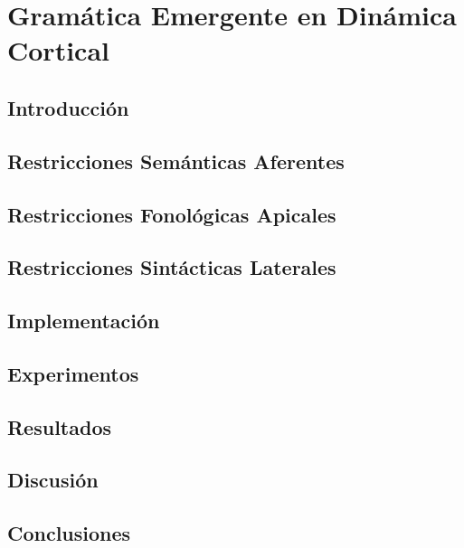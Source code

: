 \chapter{Gramática Emergente en Dinámica Cortical}

\label{ch:phonetics}

\section{Introducción}

\section{Restricciones Semánticas Aferentes}

\section{Restricciones Fonológicas Apicales}

\section{Restricciones Sintácticas Laterales}

\section{Implementación}

\section{Experimentos}

\section{Resultados}

\section{Discusión}

\section{Conclusiones}
